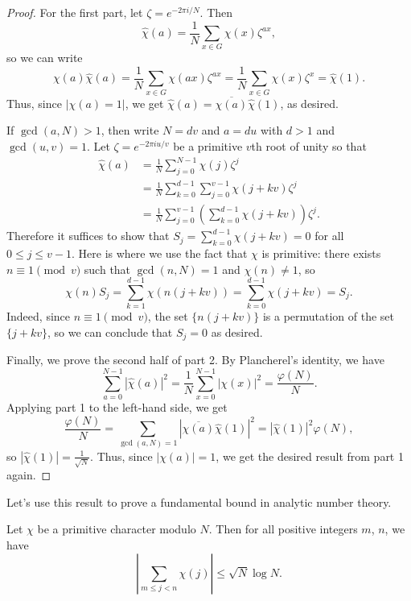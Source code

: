 \documentclass{scrartcl}
\begin{document}
\begin{proof}
	For the first part, let $\zeta = e^{-2\pi i/N}$. 
	Then 
	$$\widehat{\chi}(a) = \frac{1}{N} \sum_{x\in G} \chi(x) \zeta^{ax},$$
	so we can write 
	$$\chi(a) \widehat{\chi}(a) = \frac{1}{N} \sum_{x\in G} \chi(ax) \zeta^{ax} = \frac{1}{N} \sum_{x\in G}\chi(x) \zeta^x
	= \widehat{\chi}(1).$$
	Thus, since $|\chi(a)=1|$, we get $\widehat{\chi}(a) = \overline{\chi(a)} \widehat{\chi}(1)$, as desired. 
	
	If $\gcd(a, N)>1$, then write $N = dv$ and $a = du$ with $d>1$ and $\gcd(u, v)=1$. 
	Let $\zeta=e^{-2\pi iu/v}$ be a primitive $v$th root of unity so that 
	\begin{align*}
		\widehat{\chi}(a) &= \frac{1}{N}\sum_{j=0}^{N-1}\chi(j) \zeta^{j} \\
		&= \frac{1}{N} \sum_{k=0}^{d-1} \sum_{j=0}^{v-1} \chi(j+kv) \zeta^j \\
		&= \frac{1}{N} \sum_{j=0}^{v-1} \left(\sum_{k=0}^{d-1} \chi(j+kv)\right) \zeta^j. 
	\end{align*}
	Therefore it suffices to show that $S_j = \sum_{k=0}^{d-1} \chi(j+kv)=0$ for all $0\le j\le v-1$.
	Here is where we use the fact that $\chi$ is primitive: there exists $n\equiv 1\pmod v$ such that 
	$\gcd(n, N)=1$ and $\chi(n)\neq 1$, so 
	$$\chi(n)S_j = \sum_{k=1}^{d-1} \chi(n(j+kv)) = \sum_{k=0}^{d-1}\chi(j+kv) = S_j.$$
	Indeed, since $n\equiv 1\pmod v$, the set $\{n(j+kv)\}$ is a permutation of the set $\{j+kv\}$, 
	so we can conclude that $S_j=0$ as desired. 
	
	Finally, we prove the second half of part 2. 
	By Plancherel's identity, we have 
	$$\sum_{a=0}^{N-1} |\widehat{\chi}(a)|^2 = \frac{1}{N}\sum_{x=0}^{N-1} |\chi(x)|^2 = \frac{\varphi(N)}{N}.$$ 
	Applying part 1 to the left-hand side, we get 
	$$\frac{\varphi(N)}{N} = \sum_{\gcd(a, N)=1} \left |\overline{\chi(a)} \widehat{\chi}(1)\right |^2 = 
	|\widehat{\chi}(1)|^2 \varphi(N),$$
	so $|\widehat{\chi}(1)|=\frac{1}{\sqrt{N}}$. 
	Thus, since $|\chi(a)|=1$, we get the desired result from part 1 again. 
\end{proof}

Let's use this result to prove a fundamental bound in analytic number theory. 

\begin{theorem}
	Let $\chi$ be a primitive character modulo $N$. Then for all positive integers $m$, $n$, 
	we have 
	$$\left |\sum_{m\le j<n} \chi(j)\right | \le \sqrt{N} \log N.$$
\end{theorem}
\end{document}
